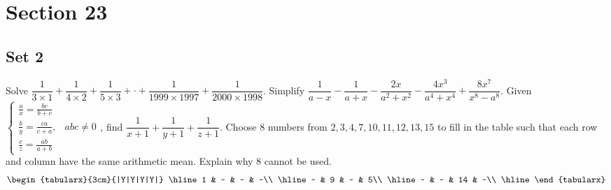 \documentclass[11pt,a4paper,twoside,UTF8]{exam}
\begin{document}
\section*{Section 23}
\subsection*{Set 2}
\begin{questions}
	\question
	Solve $\dfrac{1}{3 \times 1} + \dfrac{1}{4 \times 2} + \dfrac{1}{5 \times 3} + \cdot + \dfrac{1}{1999 \times 1997} + \dfrac{1}{2000 \times 1998}$.
	\setcounter{question}{3}
	\question
	Simplify $\dfrac{1}{a - x} - \dfrac{1}{a + x} - \dfrac{2x}{a^2 + x^2} - \dfrac{4x^3}{a^4 + x^4} + \dfrac{8x^7}{x^8 - a^8}$.
	\setcounter{question}{5}
	\question
	Given $
	\begin{cases}
	\frac{a}{x} = \frac{bc}{b + c} & \\
	\frac{b}{y} = \frac{ca}{c + a}, & abc \neq 0 \\
	\frac{c}{z} = \frac{ab}{a + b} &
	\end{cases}
	$, find $\dfrac{1}{x + 1} + \dfrac{1}{y + 1} + \dfrac{1}{z + 1}$.
	\setcounter{question}{11}
	\question
	Choose 8 numbers from $2, 3, 4, 7, 10, 11, 12, 13, 15$ to fill in the table such that each row and column have the same arithmetic mean. Explain why 8 cannot be used.
	\[
	\begin{tabularx}{3cm}{|Y|Y|Y|Y|}
	\hline
	1 & ~ & ~ & ~\\
	\hline
	~ & 9 & ~ & 5\\
	\hline
	~ & ~ & 14 & ~\\
	\hline
	\end{tabularx}
	\]
\end{questions}
\end{document}
